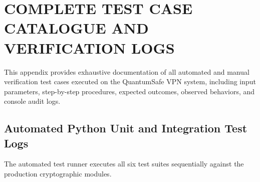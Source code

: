
\chapter{COMPLETE TEST CASE CATALOGUE AND VERIFICATION LOGS}
\label{app:test_matrix}

This appendix provides exhaustive documentation of all automated and manual verification test cases executed on the QuantumSafe VPN system, including input parameters, step-by-step procedures, expected outcomes, observed behaviors, and console audit logs.

\section{Automated Python Unit and Integration Test Logs}

The automated test runner executes all six test suites sequentially against the production cryptographic modules.

